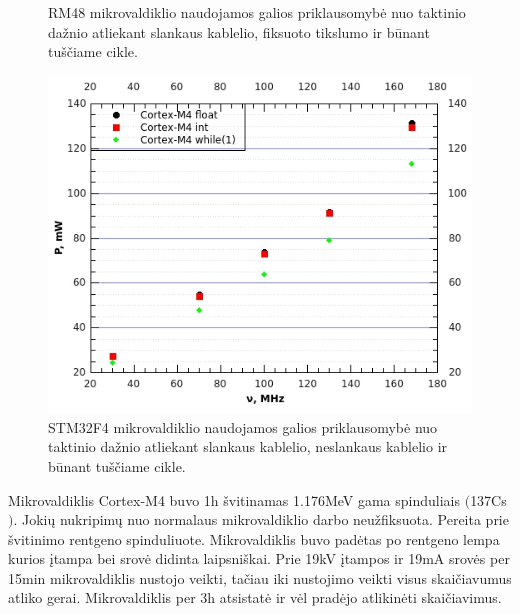 \documentclass[a4paper, 12pt]{article} %
\begin{document}
\begin{onehalfspacing}
\begin{figure}[H]
\captionsetup{labelformat=numbfirst} %
\captionsetup{labelseparator=tarpas}
\caption{RM48 mikrovaldiklio naudojamos galios priklausomyb\.e nuo taktinio da\v{z}nio atliekant slankaus kablelio, fiksuoto tikslumo ir b\=unant tu\v{s}\v{c}iame cikle.}
\label{vienas}
\end{figure}
\begin{figure}[H] %
\centering %
\includegraphics[scale=0.8]{pav/M4galia.jpg} %
\captionsetup{labelformat=numbfirst} %
\captionsetup{labelseparator=tarpas}
\caption{STM32F4 mikrovaldiklio naudojamos galios priklausomyb\.e nuo taktinio da\v{z}nio atliekant slankaus kablelio, neslankaus kablelio ir b\=unant tu\v{s}\v{c}iame cikle.}
\label{vienas}
\end{figure}
Mikrovaldiklis Cortex-M4 buvo 1h \v{s}vitinamas 1.176MeV gama spinduliais $($137Cs$)$. Joki\k{u} nukripim\k{u} nuo normalaus mikrovaldiklio darbo neu\v{z}fiksuota.
Pereita prie \v{s}vitinimo rentgeno spinduliuote. Mikrovaldiklis buvo pad\.{e}tas po rentgeno lempa kurios \k{i}tampa bei srov\.{e} didinta laipsni\v{s}kai. Prie 19kV \k{i}tampos ir 19mA srov\.{e}s per 15min mikrovaldiklis nustojo veikti, ta\v{c}iau iki nustojimo veikti visus skai\v{c}iavumus atliko gerai. Mikrovaldiklis per 3h atsistat\.{e} ir v\.{e}l prad\.{e}jo atlikin\.{e}ti skai\v{c}iavimus.
\newpage

\end{onehalfspacing}
\end{document}
